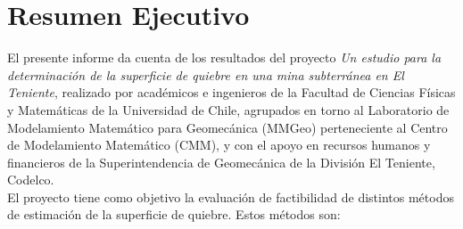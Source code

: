 \chapter{Resumen Ejecutivo}
El presente informe da cuenta de los resultados del proyecto \emph{Un estudio para la determinaci\'on de la superficie de quiebre en una mina subterr\'anea en El Teniente}, realizado por acad\'emicos e ingenieros de la Facultad de Ciencias F\'isicas y Matem\'aticas de la Universidad de Chile, agrupados en torno al Laboratorio de Modelamiento Matem\'atico para Geomec\'anica (MMGeo) perteneciente al Centro de Modelamiento Matem\'atico (CMM), y con el apoyo en recursos humanos y financieros de la Superintendencia de Geomec\'anica de la Divisi\'on El Teniente, Codelco. \\
El proyecto tiene como objetivo la evaluaci\'on de factibilidad de distintos m\'etodos de estimaci\'on de la superficie de quiebre. Estos m\'etodos son:




